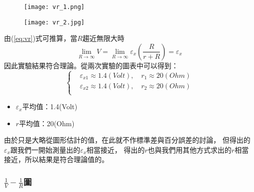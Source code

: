 \documentclass[12pt]{article}
\begin{document}
                \begin{figure}[h]
                    \begin{minipage}{0.99\textwidth}
                        \centering

                        \texttt{[image: vr\_1.png]}
                        \caption{}
                        \label{fig:vr_1}
                    \end{minipage}
                \end{figure}
                \newpage
                \begin{figure}[h]
                    \begin{minipage}{0.99\textwidth}
                        \centering

                        \texttt{[image: vr\_2.jpg]}
                        \caption{}
                        \label{fig:vr_2}
                    \end{minipage}
                \end{figure}
                \noindent 由(\ref{eq:vr})式可推算，當$R$趨近無限大時
                $$\lim_{R\rightarrow \infty}V=\lim_{R\rightarrow \infty}\varepsilon_x(\frac{R}{r+R})=\varepsilon_x$$
                因此實驗結果符合理論。從兩次實驗的圖表中可以得到：
                $$
                \begin{cases}
                    &\varepsilon_{x1}\approx 1.4(Volt),\quad r_1\approx 20(Ohm)\\
                    &\varepsilon_{x2}\approx 1.4(Volt),\quad r_2\approx 20(Ohm)\\
                \end{cases}
                $$
                \begin{itemize}
                    \item $\varepsilon_{x}$平均值：1.4(Volt)
                    \item $r$平均值：20(Ohm)
                \end{itemize}
                由於只是大略從圖形估計的值，在此就不作標準差與百分誤差的討論，
                但得出的$\varepsilon_x$跟我們一開始測量出的$\varepsilon_x$相當接近，
                得出的$r$也與我們用其他方式求出的$r$相當接近，所以結果是符合理論值的。
                \newpage

                \subsubsection{$\frac{1}{V}-\frac{1}{R}$圖}
\end{document}
